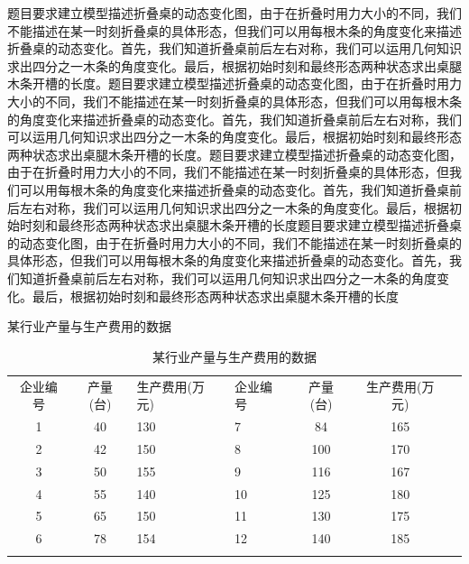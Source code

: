\documentclass[bwprint]{gmcmthesis}
\begin{document}
题目要求建立模型描述折叠桌的动态变化图，由于在折叠时用力大小的不同，我们不能描述在某一时刻折叠桌的具体形态，但我们可以用每根木条的角度变化来描述折叠桌的动态变化。首先，我们知道折叠桌前后左右对称，我们可以运用几何知识求出四分之一木条的角度变化。最后，根据初始时刻和最终形态两种状态求出桌腿木条开槽的长度。题目要求建立模型描述折叠桌的动态变化图，由于在折叠时用力大小的不同，我们不能描述在某一时刻折叠桌的具体形态，但我们可以用每根木条的角度变化来描述折叠桌的动态变化。首先，我们知道折叠桌前后左右对称，我们可以运用几何知识求出四分之一木条的角度变化。最后，根据初始时刻和最终形态两种状态求出桌腿木条开槽的长度。题目要求建立模型描述折叠桌的动态变化图，由于在折叠时用力大小的不同，我们不能描述在某一时刻折叠桌的具体形态，但我们可以用每根木条的角度变化来描述折叠桌的动态变化。首先，我们知道折叠桌前后左右对称，我们可以运用几何知识求出四分之一木条的角度变化。最后，根据初始时刻和最终形态两种状态求出桌腿木条开槽的长度题目要求建立模型描述折叠桌的动态变化图，由于在折叠时用力大小的不同，我们不能描述在某一时刻折叠桌的具体形态，但我们可以用每根木条的角度变化来描述折叠桌的动态变化。首先，我们知道折叠桌前后左右对称，我们可以运用几何知识求出四分之一木条的角度变化。最后，根据初始时刻和最终形态两种状态求出桌腿木条开槽的长度

某行业产量与生产费用的数据
\begin{table}[htp!]
\centering
\caption{某行业产量与生产费用的数据}%
\begin{tabularx}{0.94\textwidth}{c|c|YZc|c|Y}
    \Xhline{0.9pt}
	企业编号&	产量(台)&生产费用(万元)&企业编号&产量(台)&生产费用(万元)\\
	1&	40&	130&7&	84&	165\\
	2&	42&	150&8&	100&	170\\
	3&	50&	155&9&	116&	167\\
	4&	55&	140&10&	125&	180\\
	5&	65&	150&11&	130&	175\\
	6&	78&	154&12&	140&	185\\
    \Xhline{0.72pt}
\end{tabularx}
\end{table}
\end{document}
